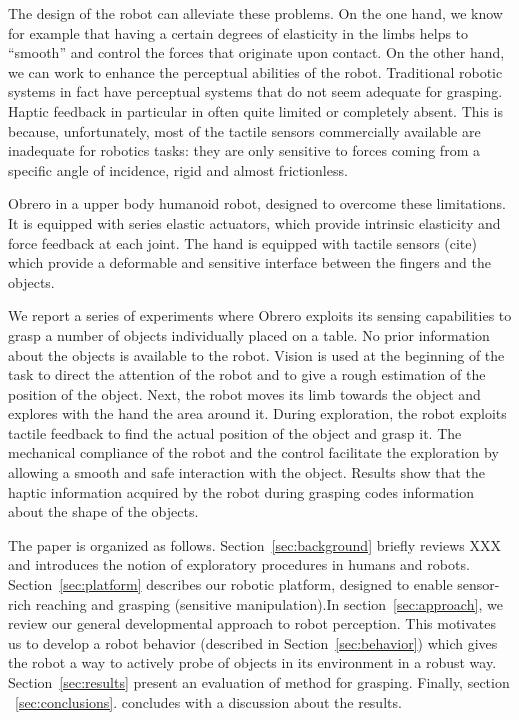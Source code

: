 The design of the robot can alleviate these problems. On the one hand, we know 
for example that having a certain degrees of elasticity in the limbs helps to 
``smooth''  and control the forces that originate upon contact.  
On the other hand, we can work to enhance the perceptual abilities of the robot.
Traditional robotic systems in fact have perceptual systems that do not seem
adequate for grasping. Haptic feedback in particular in often quite limited or 
completely absent. This is because, unfortunately, most of the tactile 
sensors commercially available are inadequate for robotics tasks: they are only 
sensitive to forces coming from a specific angle of incidence, rigid 
and almost frictionless. 

Obrero\cite{obrero} in a upper body humanoid robot, designed to overcome these
limitations. It is equipped with series elastic actuators, 
which provide intrinsic elasticity and force feedback at each joint. The hand 
is equipped with tactile sensors (cite) which provide a deformable and sensitive 
interface between the fingers and the objects.

We report a series of experiments where Obrero exploits its
sensing capabilities to grasp a number of objects individually
placed on a table. No prior information about the objects is
available to the robot. Vision is used at the beginning of the
task to direct the attention of the robot and to give a rough
estimation of the position of the object. Next, the robot moves
its limb towards the object and explores with the hand the area
around it. During exploration, the robot exploits tactile feedback
to find the actual position of the object and grasp it. The
mechanical compliance of the robot and the control facilitate the
exploration by allowing a smooth and safe interaction with the
object. Results show that the haptic information acquired by
the robot during grasping codes information about the shape of 
the objects.

The paper is organized as follows. Section~\ref{sec:background}
briefly reviews XXX and introduces the notion of exploratory
procedures in humans and robots. Section~\ref{sec:platform}
describes our robotic platform, designed to enable sensor-rich
reaching and grasping (sensitive manipulation).In
section~\ref{sec:approach}, we review our general developmental
approach to robot perception. This motivates us to develop a robot
behavior (described in Section~\ref{sec:behavior}) which gives the
robot a way to actively probe of objects in its environment in a
robust way. Section~\ref{sec:results} present an evaluation of
method for grasping. Finally, section ~\ref{sec:conclusions}.
concludes with a discussion about the results.


